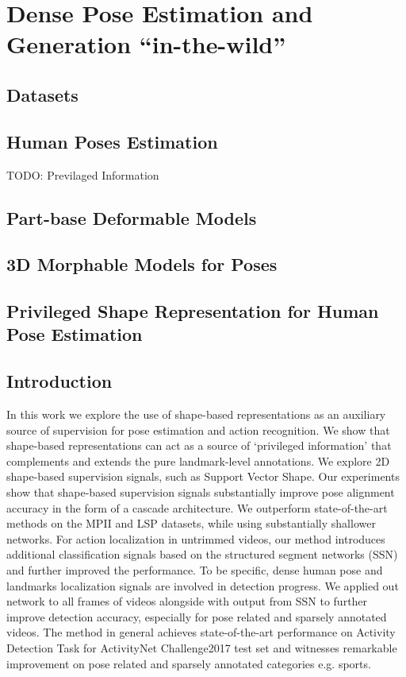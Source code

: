 \chapter{Dense Pose Estimation and Generation ``in-the-wild''}
\minitoc

\section{Datasets}

\section{Human Poses Estimation}
TODO: Previlaged Information
\section{Part-base Deformable Models}

\section{3D Morphable Models for Poses}

\section{Privileged Shape Representation for Human Pose Estimation}

\section{Introduction}

In this work we explore the use of shape-based representations as an auxiliary source of supervision for pose estimation and action recognition. We show that shape-based representations  can act as a source of `privileged information' that complements and extends the pure landmark-level annotations. We explore 2D shape-based supervision signals, such as Support Vector Shape. Our experiments show that shape-based supervision signals substantially improve pose alignment accuracy in the form of a cascade architecture. We outperform state-of-the-art methods on the MPII and LSP datasets, while using substantially shallower networks. For action localization in untrimmed videos, our method introduces additional classification signals based on the structured segment networks (SSN) and further improved the performance. To be specific, dense human pose and landmarks localization signals are involved in detection progress. We applied out network to all frames of videos alongside with output from SSN to further improve detection accuracy, especially for pose related and sparsely annotated videos. The method in general achieves state-of-the-art performance on Activity Detection Task for ActivityNet Challenge2017 test set and witnesses remarkable improvement on pose related and sparsely annotated categories e.g. sports.

